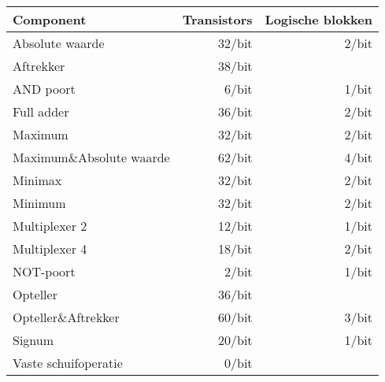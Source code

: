 \begin{tabular}{l|rr}
Component&Transistors&Logische blokken\\\hline
Absolute waarde&32/bit&2/bit\\
Aftrekker&38/bit&\\
AND poort&6/bit&1/bit\\
Full adder&36/bit&2/bit\\
Maximum&32/bit&2/bit\\
Maximum\&Absolute waarde&62/bit&4/bit\\
Minimax&32/bit&2/bit\\
Minimum&32/bit&2/bit\\
Multiplexer 2&12/bit&1/bit\\
Multiplexer 4&18/bit&2/bit\\
NOT-poort&2/bit&1/bit\\
Opteller&36/bit&\\
Opteller\&Aftrekker&60/bit&3/bit\\
Signum&20/bit&1/bit\\
Vaste schuifoperatie&0/bit&\\
\end{tabular}